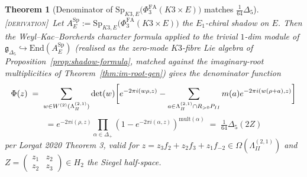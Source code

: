 \documentclass[11pt]{amsart}
\providecommand{\R}{\mathbb{R}}
\providecommand{\Eone}{E_{1}}
\providecommand{\HB}{\Lambda^{(2,1)}_{I\!I}}
\providecommand{\Gdelta}{\mathfrak{g}_{\Delta_{5}}}
\providecommand{\PhiFA}{\Phi^{\mathrm{FA}}}
\providecommand{\SpF}{\mathrm{Sp}}
\providecommand{\ClaimStatusDerivation}{\textsc{[derivation]}}
\theoremstyle{plain}
\newtheorem{theorem}{Theorem}[section]
\theoremstyle{definition}
\theoremstyle{remark}
\begin{document}
\begin{theorem}[Denominator of $\SpF_{K3, E}\bigl(\PhiFA_{3}(K3\times E)
\bigr)$ matches $\tfrac{1}{64}\Delta_{5}$]\label{thm:denominator-match}
\ClaimStatusDerivation\
Let $A^{\SpF}_{E} := \SpF_{K3, E}\bigl(\PhiFA_{3}(K3\times E)\bigr)$
the $\Eone$-chiral shadow on $E$. Then the Weyl--Kac--Borcherds
character formula applied to the trivial $1$-dim module of
$\Gdelta\hookrightarrow \mathrm{End}(A^{\SpF}_{E})$ (realised as the
zero-mode $K3$-fibre Lie algebra of
Proposition~\ref{prop:shadow-formula}, matched against the imaginary-root
multiplicities of Theorem~\ref{thm:im-root-gen}) gives the
denominator function
\begin{equation}\label{eq:WKB-match}
\Phi(z) \;=\; \sum_{w\in W^{(2)}(\HB)} \det(w)\biggl[e^{-2\pi i (w\rho,z)}
- \sum_{a\in \HB\cap \R_{>0}\cP_{II}} m(a) e^{-2\pi i(w(\rho+a),z)}\biggr]
\end{equation}
\[
= e^{-2\pi i(\rho, z)}\prod_{\alpha\in\Delta_{+}}
(1 - e^{-2\pi i(\alpha, z)})^{\mathrm{mult}(\alpha)}
\;=\; \tfrac{1}{64}\Delta_{5}(2 Z)
\]
per Lorgat 2020 Theorem 3, valid for $z = z_{3}f_{2}+z_{2}f_{3}+z_{1}
f_{-2}\in\Omega(\HB)$ and $Z = \begin{pmatrix}z_{1}&z_{2}\\ z_{2}&z_{3}
\end{pmatrix}\in H_{2}$ the Siegel half-space.
\end{theorem}
\end{document}
